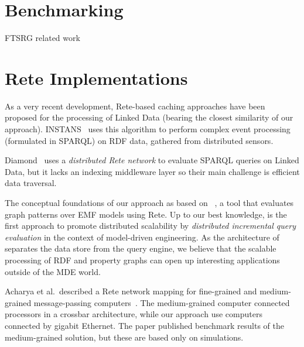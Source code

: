 \section{Benchmarking}

FTSRG related work



\section{Rete Implementations}


As a very recent development, Rete-based caching approaches have been proposed for the processing of Linked Data (bearing the closest similarity of our approach). \mbox{INSTANS}~\cite{INSTANS2012} uses this algorithm to perform complex event processing (formulated in SPARQL) on RDF data, gathered from distributed sensors.

Diamond~\cite{miranker2012diamond} uses a \emph{distributed Rete network} to evaluate SPARQL queries on Linked Data, but it lacks an indexing middleware layer so their main challenge is efficient data traversal.

The conceptual foundations of our approach as based on \eiq{}~\cite{models10}, a tool that evaluates graph patterns over EMF models using Rete. Up to our best knowledge, \iqd{} is the first approach to promote distributed scalability by \emph{distributed incremental query evaluation} in the context of model-driven engineering. As the architecture of \iqd{} separates the data store from the query engine, we believe that the scalable processing of RDF and property graphs can open up interesting applications outside of the MDE world.

Acharya et al.\ described a Rete network mapping for fine-grained and medium-grained message-passing computers~\cite{message-passing-rete}. The medium-grained computer connected processors in a crossbar architecture, while our approach use computers connected by gigabit Ethernet. The paper published benchmark results of the medium-grained solution, but these are based only on simulations.

